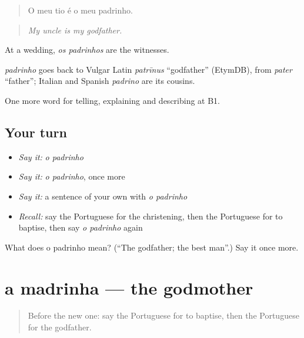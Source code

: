 \begin{quote}
O meu tio é o meu padrinho.
\end{quote}

\begin{quote}
\emph{My uncle is my godfather.}
\end{quote}

At a wedding, \emph{os padrinhos} are the witnesses.

\begin{cousinweb}
\emph{padrinho} goes back to Vulgar Latin \emph{patrīnus} \textquotedblleft{}godfather\textquotedblright{} (EtymDB), from \emph{pater} \textquotedblleft{}father\textquotedblright{}; Italian and Spanish \emph{padrino} are its cousins.
\end{cousinweb}

\begin{grammarlens}[title={What you've built}]
One more word for telling, explaining and describing at B1.
\end{grammarlens}

\subsection*{Your turn}
\begin{itemize}
\raggedright
  \item \emph{Say it:} \emph{o padrinho}
  \item \emph{Say it:} \emph{o padrinho}, once more
  \item \emph{Say it:} a sentence of your own with \emph{o padrinho}
  \item \emph{Recall:} say the Portuguese for the christening, then the Portuguese for to baptise, then say \emph{o padrinho} again
\end{itemize}

\begin{tcolorbox}[breakable,colback=teal!4,colframe=teal!35!black,title={Before you move on}]
What does o padrinho mean? (\textquotedblleft{}The godfather; the best man\textquotedblright{}.) Say it once more.
\end{tcolorbox}
\section[a madrinha]{a madrinha — the godmother}

\label{lesson:PT-C310-madrinha}



\begin{quote}
Before the new one: say the Portuguese for to baptise, then the Portuguese for the godfather.
\end{quote}

